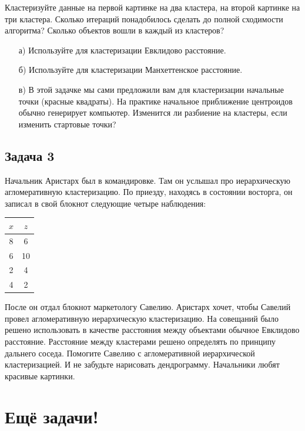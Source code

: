 \documentclass[12pt, a4paper, oneside]{article}
\begin{document}
Кластеризуйте данные на первой картинке на два кластера, на второй картинке на три кластера. Сколько итераций понадобилось сделать до полной сходимости алгоритма? Сколько объектов вошли в каждый из кластеров? 

\begin{enumerate}
	\item[а)] Используйте для кластеризации Евклидово расстояние.
	\item[б)] Используйте для кластеризации Манхеттенское расстояние.
	\item[в)] В этой задачке мы сами предложили вам для кластеризации начальные точки (красные квадраты). На практике начальное приближение центроидов обычно генерирует компьютер.  Изменится ли разбиение на кластеры, если изменить стартовые точки?
\end{enumerate}


\subsection*{Задача 3 }

Начальник Аристарх был в командировке. Там он услышал про иерархическую агломеративную кластеризацию. По приезду, находясь в состоянии восторга, он записал в свой блокнот следующие четыре наблюдения:

\begin{center}
\begin{tabular}{c|c}
	\hline
	$x$ & $z$ \\
	\hline
	8 & 6   \\
	6 & 10 \\
	2 & 4   \\
	4 & 2   \\
\end{tabular}
\end{center}

После он отдал блокнот маркетологу Савелию. Аристарх хочет, чтобы Савелий провел агломеративную иерархическую кластеризацию.  На совещаний было решено использовать в качестве расстояния между объектами обычное Евклидово расстояние. Расстояние между кластерами решено определять по принципу дальнего соседа. Помогите Савелию с агломеративной иерархической кластеризацией. И не забудьте нарисовать дендрограмму. Начальники любят красивые картинки. 

\section*{Ещё задачи!}
\end{document}
